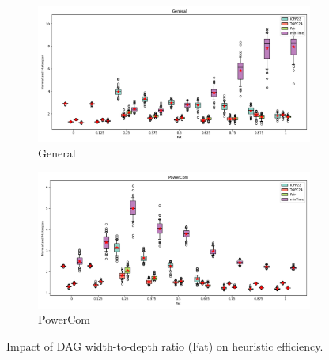 \documentclass{article}
\begin{document}
\begin{figure}[htbp]
\\[2ex]
\begin{subfigure}[b]{0.32\textwidth}\includegraphics[width=\textwidth]{Results/Fat/Fat_General_boxplot}\caption{General}\label{fig:boxplot_figures_Fat_General}\end{subfigure}
\hfill
\begin{subfigure}[b]{0.32\textwidth}\includegraphics[width=\textwidth]{Results/Fat/Fat_PowerCom_boxplot}\caption{PowerCom}\label{fig:boxplot_figures_Fat_PowerCom}\end{subfigure}
\hfill
\caption{Impact of DAG width-to-depth ratio (Fat) on heuristic efficiency.}
\label{fig:boxplot_figures_Fat}
\end{figure}
\end{document}
